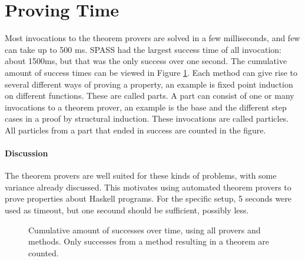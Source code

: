 \section{Proving Time}

Most invocations to the theorem provers are solved in a few
milliseconds, and few can take up to 500 ms. SPASS had the largest
success time of all invocation: about 1500ms, but that was the only success
over one second. The cumulative amount of success times can be viewed
in Figure \ref{fig:provingtime}. Each method can give rise to
several different ways of proving a property, an example is fixed
point induction on different functions. These are called parts. A part
can consist of one or many invocations to a theorem prover, an example
is the base and the different step cases in a proof by structural
induction. These invocations are called particles. All particles from
a part that ended in success are counted in the figure.

\paragraph{Discussion}

The theorem provers are well suited for these kinds of problems, with
some variance already discussed. This motivates using automated
theorem provers to prove properties about Haskell programs. For the
specific setup, 5 seconds were used as timeout, but one secound should
be sufficient, possibly less.

\begin{figure}[h]
\centering
{}
\caption{Cumulative amount of successes over time, using all provers
  and methods. Only successes from a method resulting in a theorem are counted.
\label{fig:provingtime}
}
\end{figure}



